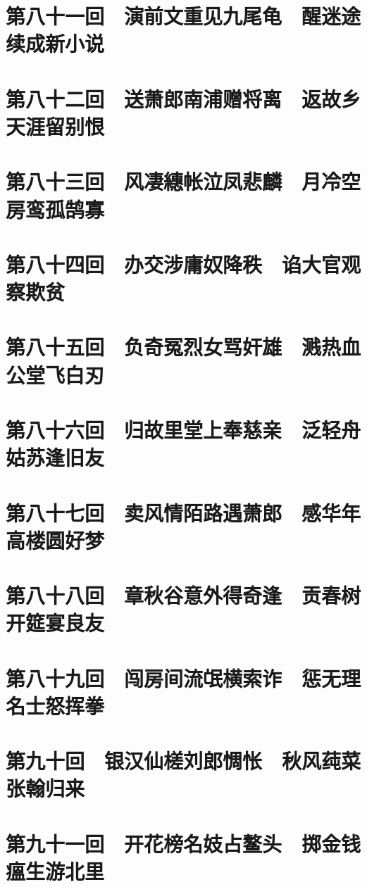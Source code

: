 \documentclass[12pt,UTF8]{ctexbook}
\begin{document}
\chapter{第八十一回　演前文重见九尾龟　醒迷途续成新小说}

\chapter{第八十二回　送萧郎南浦赠将离　返故乡天涯留别恨}

\chapter{第八十三回　风凄繐帐泣凤悲麟　月冷空房鸾孤鹄寡}

\chapter{第八十四回　办交涉庸奴降秩　谄大官观察欺贫}

\chapter{第八十五回　负奇冤烈女骂奸雄　溅热血公堂飞白刃}

\chapter{第八十六回　归故里堂上奉慈亲　泛轻舟姑苏逢旧友}

\chapter{第八十七回　卖风情陌路遇萧郎　感华年高楼圆好梦}

\chapter{第八十八回　章秋谷意外得奇逢　贡春树开筵宴良友}

\chapter{第八十九回　闯房间流氓横索诈　惩无理名士怒挥拳}

\chapter{第九十回　银汉仙槎刘郎惆怅　秋风莼菜张翰归来}

\chapter{第九十一回　开花榜名妓占鳌头　掷金钱瘟生游北里}
\end{document}

